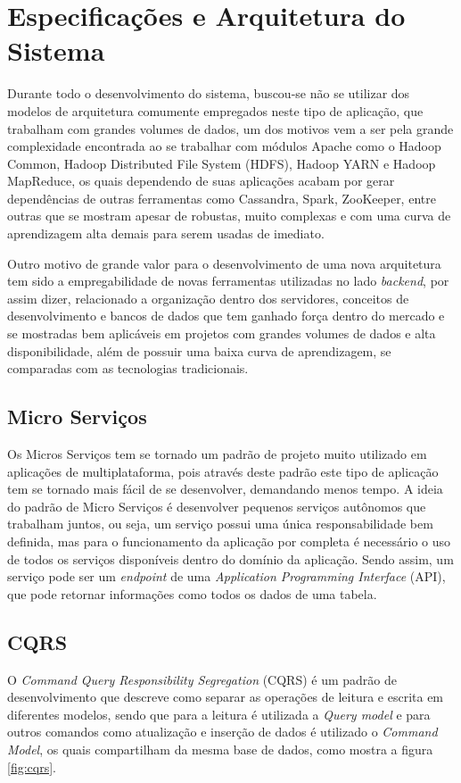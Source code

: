 \chapter{Especificações e Arquitetura do Sistema}
\label{chap:arquitetura}
Durante todo o desenvolvimento do sistema, buscou-se não se utilizar dos modelos de arquitetura comumente empregados neste tipo de aplicação, que trabalham com grandes volumes de dados, um dos motivos vem a ser pela grande complexidade encontrada ao se trabalhar com módulos Apache como o Hadoop Common, Hadoop Distributed File System (HDFS), Hadoop YARN e Hadoop MapReduce, os quais dependendo de suas aplicações acabam por gerar dependências de outras ferramentas como Cassandra, Spark, ZooKeeper, entre outras que se mostram apesar de robustas, muito complexas e com uma curva de aprendizagem alta demais para serem usadas de imediato.

Outro motivo de grande valor para o desenvolvimento de uma nova arquitetura tem sido a empregabilidade de novas ferramentas utilizadas no lado \textit{backend}, por assim dizer, relacionado a organização dentro dos servidores, conceitos de desenvolvimento e bancos de dados que tem ganhado força dentro do mercado e se mostradas bem aplicáveis em projetos com grandes volumes de dados e alta disponibilidade, além de possuir uma baixa curva de aprendizagem, se comparadas com as tecnologias tradicionais.

\section{Micro Serviços}
\label{sec:microserviços}
Os Micros Serviços tem se tornado um padrão de projeto muito utilizado em aplicações de multiplataforma, pois através deste padrão este tipo de aplicação tem se tornado mais fácil de se desenvolver, demandando menos tempo. A ideia do padrão de Micro Serviços é desenvolver pequenos serviços autônomos que trabalham juntos, ou seja, um serviço possui uma única responsabilidade bem definida, mas para o funcionamento da aplicação por completa é necessário o uso de todos os serviços disponíveis dentro do domínio da aplicação. Sendo assim, um serviço pode ser um \textit{endpoint} de uma \textit{Application Programming Interface} (API), que pode retornar informações como todos os dados de uma tabela.~\cite{newman2015building}

\section{CQRS}
O \textit{Command Query Responsibility Segregation} (CQRS) é um padrão de desenvolvimento que descreve como separar as operações de leitura e escrita em diferentes modelos, sendo que para a leitura é utilizada a \textit{Query model} e para outros comandos como atualização e inserção de dados é utilizado o \textit{Command Model}, os quais compartilham da mesma base de dados, como mostra a figura \ref{fig:cqrs}.

